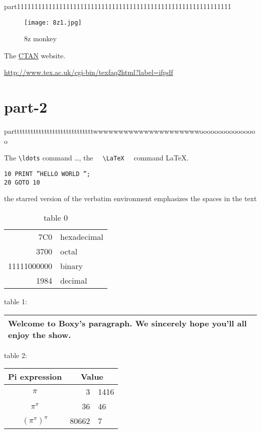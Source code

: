 \documentclass[a4paper,11pt, twoside]{article}
\begin{document}
part1111111111111111111111111111111111111111111111111111111111111

\begin{figure}[!h]
\centering
\texttt{[image: 8z1.jpg]}
\caption{8z monkey}
\end{figure}

The \href{http://www.ctan.org}{CTAN} website.

\url{http://www.tex.ac.uk/cgi-bin/texfaq2html?label=ifpdf}

\part{part-2}

partttttttttttttttttttttttttttttwwwwwwwwwwwwwwwwwwwwwoooooooooooooooo

The \verb|\ldots| command \ldots, the \verb*|  \LaTeX  | command \LaTeX.
\begin{verbatim}
10 PRINT ”HELLO WORLD ”;
20 GOTO 10
\end{verbatim}

\begin{verbatim*}
the starred version of
the
verbatim
environment emphasizes
the spaces
in the text
\end{verbatim*}


\begin{table}[h]
\caption{table 0}
\begin{center}
\begin{tabular}{|r|l|}
\hline
7C0 & hexadecimal \\
3700 & octal \\
\cline{2-2}
11111000000 & binary \\
\hline
\hline
1984 & decimal \\
\hline
\end{tabular}
\end{center}
\end{table}

table 1:
\begin{tabular}{|p{4.7cm}|}
\hline
Welcome to Boxy’s paragraph.
We sincerely hope you’ll
all enjoy the show.\\
\hline
\end{tabular}

table 2:
\begin{tabular}{c r @{.} l}
Pi expression
&
\multicolumn{2}{c}{Value} \\
\hline
$\pi$
& 3&1416 \\
$\pi^{\pi}$
& 36&46
\\
$(\pi^{\pi})^{\pi}$ & 80662&7 \\
\end{tabular}
\end{document}
